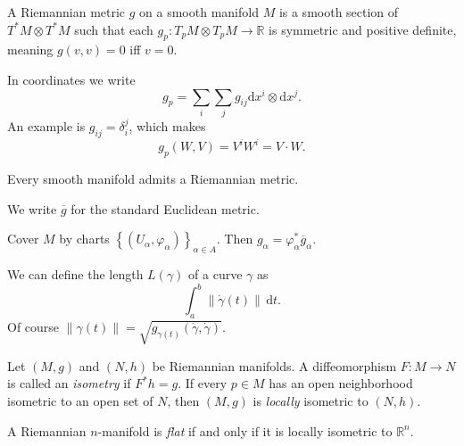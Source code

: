 
\begin{definition}\label{????????}
	A Riemannian metric $g$ on a smooth manifold $M$ is a smooth section of $T^*M\otimes T^*M$ such that each $g_p : T_pM \otimes T_pM \to \mathbb{R} $ is symmetric and positive definite, meaning $g(v,v)=0$ iff $v=0$.
\end{definition}
In coordinates we write
\[
	g_p=\sum_i \sum_{j} g_{ij} \mathrm{d} x^i \otimes \mathrm{d} x^j
.\]
An example is $g_{ij}=\delta _i^j$, which makes
\[
	g_p(W,V) = V^iW^i = V\cdot W
.\]
\begin{proposition}\label{prp:}
	Every smooth manifold admits a Riemannian metric.
\end{proposition}

We write $\overline{g} $ for the standard Euclidean metric.

\begin{proposition}\label{askjdnsk}
	Cover $M$ by charts $\left\{ (U_\alpha ,\varphi _\alpha ) \right\} _{\alpha \in A} $. Then $g_\alpha =\varphi _\alpha ^* \overline{g}_\alpha $.
\end{proposition}
We can define the length $L(\gamma )$ of a curve $\gamma $ as
\[
	\int _a^b \left\| \dot{\gamma } (t) \right\|  \,\mathrm{d} t
.\]
Of course $\left\| \gamma (t) \right\| =\sqrt{g_{\gamma (t)} (\dot{\gamma } ,\dot{\gamma } )} $.

\begin{definition}\label{kasdkjs}
	Let $(M,g)$ and $(N,h)$ be Riemannian manifolds. A diffeomorphism $F : M \to N$ is called an \emph{isometry} if $F^*h=g$. If every $p\in M$ has an open neighborhood isometric to an open set of $N$, then $(M,g)$ is \emph{locally} isometric to $(N,h)$.
\end{definition}

\begin{definition}\label{kwoooo}
	A Riemannian $n$-manifold is \emph{flat} if and only if it is locally isometric to $\mathbb{R} ^n$.
\end{definition}

